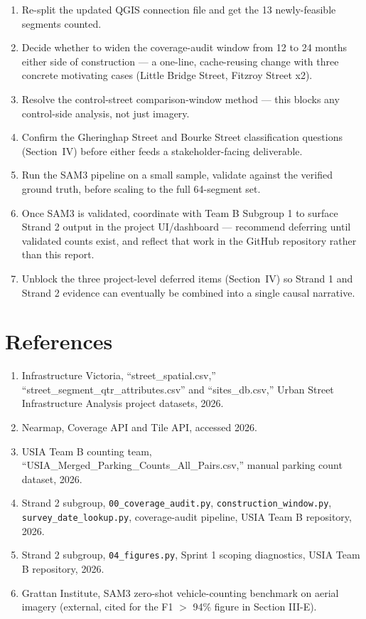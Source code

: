 \documentclass[10pt,conference]{IEEEtran}
\begin{document}
\begin{enumerate}[leftmargin=*]
\item Re-split the updated QGIS connection file and get the 13 newly-feasible segments counted.
\item Decide whether to widen the coverage-audit window from 12 to 24 months either side of construction --- a one-line, cache-reusing change with three concrete motivating cases (Little Bridge Street, Fitzroy Street x2).
\item Resolve the control-street comparison-window method --- this blocks any control-side analysis, not just imagery.
\item Confirm the Gheringhap Street and Bourke Street classification questions (Section~IV) before either feeds a stakeholder-facing deliverable.
\item Run the SAM3 pipeline on a small sample, validate against the verified ground truth, before scaling to the full 64-segment set.
\item Once SAM3 is validated, coordinate with Team B Subgroup 1 to surface Strand 2 output in the project UI/dashboard --- recommend deferring until validated counts exist, and reflect that work in the GitHub repository rather than this report.
\item Unblock the three project-level deferred items (Section~IV) so Strand 1 and Strand 2 evidence can eventually be combined into a single causal narrative.
\end{enumerate}

\section*{References}
\begin{enumerate}[leftmargin=*]
\item Infrastructure Victoria, ``street\_spatial.csv,'' ``street\_segment\_qtr\_attributes.csv'' and ``sites\_db.csv,'' Urban Street Infrastructure Analysis project datasets, 2026.
\item Nearmap, Coverage API and Tile API, accessed 2026.
\item USIA Team B counting team, ``USIA\_Merged\_Parking\_Counts\_All\_Pairs.csv,'' manual parking count dataset, 2026.
\item Strand 2 subgroup, \texttt{00\_coverage\_audit.py}, \texttt{construction\_window.py}, \texttt{survey\_date\_lookup.py}, coverage-audit pipeline, USIA Team B repository, 2026.
\item Strand 2 subgroup, \texttt{04\_figures.py}, Sprint 1 scoping diagnostics, USIA Team B repository, 2026.
\item Grattan Institute, SAM3 zero-shot vehicle-counting benchmark on aerial imagery (external, cited for the F1 $>$ 94\% figure in Section III-E).
\end{enumerate}
\end{document}
